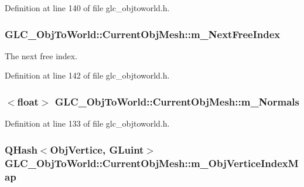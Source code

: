 Definition at line 140 of file glc\-\_\-objtoworld.\-h.

\hypertarget{struct_g_l_c___obj_to_world_1_1_current_obj_mesh_a5a64c9e796da66ce9d1e4acd62ffec3e}{
\subsubsection[{m\-\_\-\-Next\-Free\-Index}]{ G\-L\-C\-\_\-\-Obj\-To\-World\-::\-Current\-Obj\-Mesh\-::m\-\_\-\-Next\-Free\-Index}}\label{struct_g_l_c___obj_to_world_1_1_current_obj_mesh_a5a64c9e796da66ce9d1e4acd62ffec3e}


The next free index. 



Definition at line 142 of file glc\-\_\-objtoworld.\-h.

\hypertarget{struct_g_l_c___obj_to_world_1_1_current_obj_mesh_a471a42e6442c4ea2bc20c64e5949e436}{
\subsubsection[{m\-\_\-\-Normals}]{$<${\bf float}$>$ G\-L\-C\-\_\-\-Obj\-To\-World\-::\-Current\-Obj\-Mesh\-::m\-\_\-\-Normals}}\label{struct_g_l_c___obj_to_world_1_1_current_obj_mesh_a471a42e6442c4ea2bc20c64e5949e436}


Definition at line 133 of file glc\-\_\-objtoworld.\-h.

\hypertarget{struct_g_l_c___obj_to_world_1_1_current_obj_mesh_a7f8362f998fc4f2b11c07d0acce2658d}{
\subsubsection[{m\-\_\-\-Obj\-Vertice\-Index\-Map}]{\setlength{\rightskip}{0pt plus 5cm}Q\-Hash$<${\bf Obj\-Vertice}, {\bf G\-Luint}$>$ G\-L\-C\-\_\-\-Obj\-To\-World\-::\-Current\-Obj\-Mesh\-::m\-\_\-\-Obj\-Vertice\-Index\-Map}}\label{struct_g_l_c___obj_to_world_1_1_current_obj_mesh_a7f8362f998fc4f2b11c07d0acce2658d}


